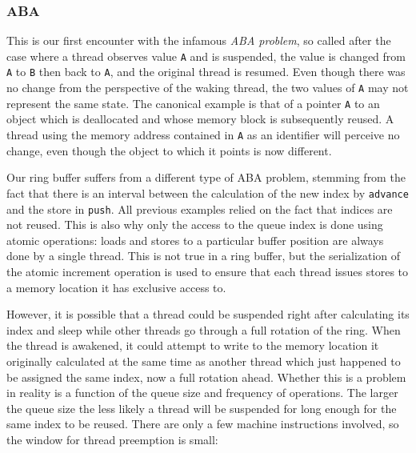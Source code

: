 \subsubsection{ABA}

This is our first encounter with the infamous \textit{ABA problem}, so called
after the case where a thread observes value \texttt{A} and is suspended, the
value is changed from \texttt{A} to \texttt{B} then back to \texttt{A}, and the
original thread is resumed.  Even though there was no change from the
perspective of the waking thread, the two values of \texttt{A} may not represent
the same state.  The canonical example is that of a pointer \texttt{A} to an
object which is deallocated and whose memory block is subsequently
reused\footnotemark.  A thread using the memory address contained in \texttt{A}
as an identifier will perceive no change, even though the object to which it
points is now different.


Our ring buffer suffers from a different type of ABA problem, stemming from the
fact that there is an interval between the calculation of the new index by
\texttt{advance} and the store in \texttt{push}.  All previous examples relied
on the fact that indices are not reused.  This is also why only the access to
the queue index is done using atomic operations: loads and stores to a
particular buffer position are always done by a single thread.  This is not true
in a ring buffer, but the serialization of the atomic increment operation is
used to ensure that each thread issues stores to a memory location it has
exclusive access to.

However, it is possible that a thread could be suspended right after calculating
its index and sleep while other threads go through a full rotation of the ring.
When the thread is awakened, it could attempt to write to the memory location it
originally calculated at the same time as another thread which just happened to
be assigned the same index, now a full rotation ahead.  Whether this is a
problem in reality is a function of the queue size and frequency of operations.
The larger the queue size the less likely a thread will be suspended for long
enough for the same index to be reused.  There are only a few machine
instructions involved, so the window for thread preemption is small:

